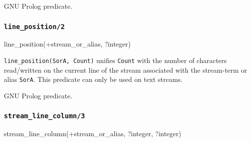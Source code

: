 \Portability

GNU Prolog predicate.

\subsubsection{\texttt{line\_position/2}}
\label{line-position/2}

\begin{TemplatesOneCol}
line\_position(+stream\_or\_alias, ?integer)

\end{TemplatesOneCol}

\Description

\texttt{line\_position(SorA, Count)} unifies
\texttt{Count} with the number of characters read/written on the current
line of the stream associated with the stream-term or alias
\texttt{SorA}. This predicate can only be used on text streams.

\begin{PlErrors}






\end{PlErrors}

\Portability

GNU Prolog predicate.

\subsubsection{\texttt{stream\_line\_column/3}}

\begin{TemplatesOneCol}
stream\_line\_column(+stream\_or\_alias, ?integer, ?integer)

\end{TemplatesOneCol}

\Description

